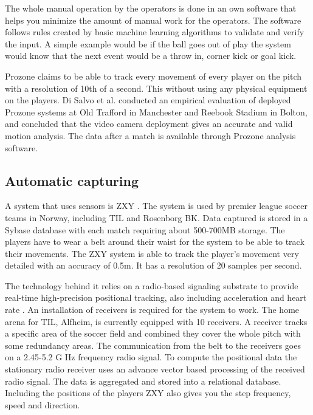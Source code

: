 The whole manual operation by the operators is done in an own software that helps you minimize the amount of manual work for the operators. The software follows rules created by basic machine learning algorithms to validate and verify the input. A simple example would be if the ball goes out of play the system would know that the next event would be a throw in, corner kick or goal kick.

Prozone claims to be able to track every movement of every player on the pitch with a resolution of 10th of a second. This without using any physical equipment on the players. Di Salvo et al. \cite{Prozone:validation} conducted an empirical evaluation of deployed Prozone systems at Old Trafford in Manchester and Reebook Stadium in Bolton, and concluded that the video camera deployment gives an accurate and valid motion analysis. The data after a match is available through Prozone analysis software. 

\subsection{Automatic capturing}

A system that uses sensors is \ac{ZXY} . The system is used by premier league soccer teams in Norway, including \ac{TIL} and Rosenborg BK. Data captured is stored in a Sybase database with each match requiring about 500-700MB storage. The players have to wear a belt around their waist for the system to be able to track their movements. The ZXY system is able to track the player’s movement very detailed with an accuracy of 0.5m. It has a resolution of 20 samples per second. 

The technology behind it relies on a radio-based signaling substrate to provide real-time high-precision positional tracking, also including acceleration and heart rate \cite{PTW}. An installation of receivers is required for the system to work. The home arena for \ac{TIL}, Alfheim, is currently equipped with 10 receivers. A receiver tracks a specific area of the soccer field and combined they cover the whole pitch with some redundancy areas. The communication from the belt to the receivers goes on a 2.45-5.2 G Hz frequency radio signal. To compute the positional data the stationary radio receiver uses an advance vector based processing of the received radio signal. The data is aggregated and stored into a relational database. Including the positions of the players ZXY also gives you the step frequency, speed and direction.

